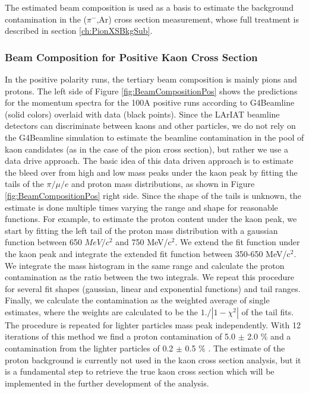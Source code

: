 The estimated beam composition is used as a basis to estimate the background contamination in the  ($\pi^{-}$,Ar) cross section measurement, whose  full treatment is described in section \ref{ch:PionXSBkgSub}.

\subsubsection{Beam Composition for Positive Kaon Cross Section}
In the positive polarity runs, the tertiary beam composition is mainly pions and protons. The left side of Figure \ref{fig:BeamCompositionPos} shows the  predictions for the momentum spectra for the 100A positive runs  according to  G4Beamline (solid colors) overlaid with data (black points). 
Since the LArIAT beamline detectors can discriminate between kaons and other particles, we do not rely on the G4Beamline simulation to estimate the beamline contamination in the pool of kaon candidates (as in the case of the pion cross section), but rather we use a data drive approach. 
The basic idea of this data driven approach is to estimate the bleed over from high and low mass peaks under the kaon peak by fitting the tails of the $\pi/\mu/e$ and proton mass distributions, as shown in Figure \ref{fig:BeamCompositionPos} right side. 
Since the shape of the tails is unknown, the estimate is done multiple times varying the range and shape for reasonable functions. 
For example, to estimate the proton content under the kaon peak, we start by fitting the left tail of the proton mass distribution with a gaussian function between 650 $MeV/c^2$ and 750 MeV/c$^2$. %
 We extend the fit function under the kaon peak and integrate the extended fit function between 350-650 MeV/c$^2$. We integrate the mass histogram in the same range and calculate the proton contamination as the ratio between the two integrals. We repeat this procedure for several fit shapes (gaussian, linear and exponential functions) and tail ranges. Finally, we calculate the contamination as the weighted average of single estimates, where the weights are calculated to be the $1./|1-\chi^2|$ of the tail fits. The procedure is repeated for lighter particles mass peak independently.
With 12 iterations of this method we find a proton contamination of  5.0 $\pm$ 2.0 \%  and a contamination from the lighter particles of 0.2 $\pm$ 0.5 \% .
The estimate of the proton background is currently not used in the kaon cross section analysis, but it is a fundamental step to retrieve the true kaon cross section which will be implemented in the further development of the analysis.


